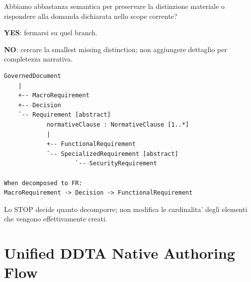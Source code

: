 \documentclass[11pt,a4paper]{article}
\begin{document}
\begin{ddtacheck}[title={Stopping criterion generale}]
Abbiamo abbastanza semantica per preservare la distinzione materiale o rispondere alla domanda dichiarata nello scope corrente?\par
\textbf{YES}: fermarsi su quel branch.\par
\textbf{NO}: cercare la smallest missing distinction; non aggiungere dettaglio per completezza narrativa.
\end{ddtacheck}

\begin{ddtacore}[title={Structural baseline da non confondere con lo stopping rule}]
\begin{lstlisting}
GovernedDocument
    |
    +-- MacroRequirement
    +-- Decision
    `-- Requirement [abstract]
            normativeClause : NormativeClause [1..*]
            |
            +-- FunctionalRequirement
            `-- SpecializedRequirement [abstract]
                    `-- SecurityRequirement

When decomposed to FR:
MacroRequirement -> Decision -> FunctionalRequirement
\end{lstlisting}
Lo STOP decide quanto decomporre; non modifica le cardinalita' degli elementi che vengono effettivamente creati.
\end{ddtacore}

\section{Unified DDTA Native Authoring Flow}
\end{document}
